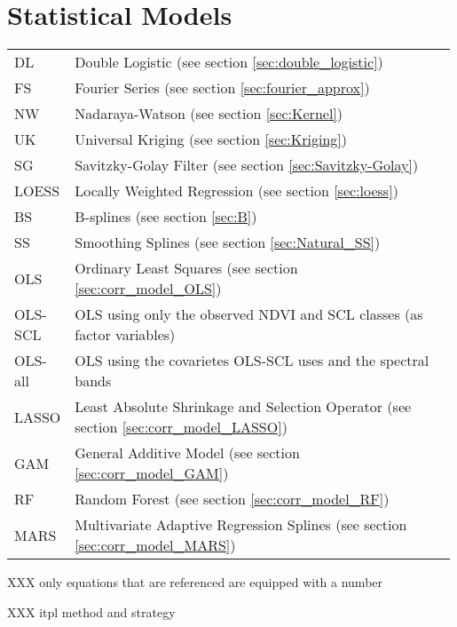 \section*{Statistical Models}
\begin{longtable}{p{0.12\linewidth} p{0.87\linewidth}}
	DL
		& Double Logistic (see section \ref{sec:double_logistic})\\
	FS
		& Fourier Series (see section \ref{sec:fourier_approx})\\
	NW
		& Nadaraya-Watson (see section \ref{sec:Kernel})\\
	UK
		& Universal Kriging (see section \ref{sec:Kriging})\\
	SG
		& Savitzky-Golay Filter (see section \ref{sec:Savitzky-Golay})\\
	LOESS
		& Locally Weighted Regression (see section \ref{sec:loess})\\
	BS
		& B-splines (see section \ref{sec:B})\\
	SS
		& Smoothing Splines (see section \ref{sec:Natural_SS})\\
	OLS
		& Ordinary Least Squares (see section \ref{sec:corr_model_OLS})\\
	OLS-SCL
		& OLS using only the observed NDVI and SCL classes (as factor variables)\\
	OLS-all
		& OLS using the covarietes OLS-SCL uses and the spectral bands\\
	LASSO
		& Least Absolute Shrinkage and Selection Operator (see section \ref{sec:corr_model_LASSO})\\
	GAM
		& General Additive Model (see section \ref{sec:corr_model_GAM})\\
	RF
		& Random Forest (see section \ref{sec:corr_model_RF})\\
	MARS
		& Multivariate Adaptive Regression Splines (see section \ref{sec:corr_model_MARS})\\
\end{longtable} \renewcommand{\arraystretch}{1}


XXX only equations that are referenced are equipped with a number

XXX itpl method and strategy









